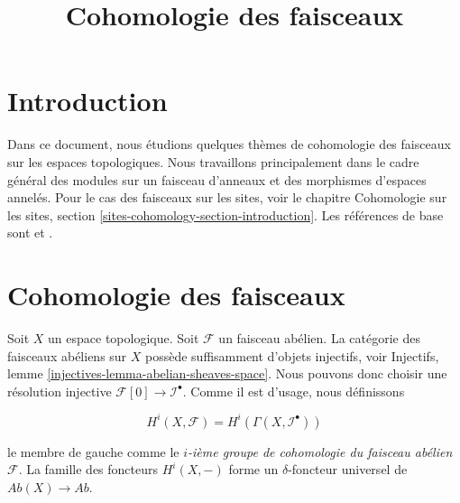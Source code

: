 

%


\title{Cohomologie des faisceaux}


\maketitle

\label{section-phantom}

\tableofcontents

\section{Introduction}

\label{section-introduction}

\noindent
Dans ce document, nous étudions quelques thèmes de cohomologie des faisceaux sur les espaces topologiques. Nous travaillons principalement dans le cadre général des modules sur un faisceau d'anneaux et des morphismes d'espaces annelés. Pour le cas des faisceaux sur les sites, voir le chapitre Cohomologie sur les sites, section \ref{sites-cohomology-section-introduction}. Les références de base sont \cite{Godement} et \cite{Iversen}.





\section{Cohomologie des faisceaux}

\label{section-cohomology-sheaves}

\noindent

Soit $X$ un espace topologique. Soit $\mathcal{F}$ un faisceau abélien. La catégorie des faisceaux abéliens sur $X$ possède suffisamment d'objets injectifs, voir Injectifs, lemme \ref{injectives-lemma-abelian-sheaves-space}. Nous pouvons donc choisir une résolution injective
$\mathcal{F}[0] \to \mathcal{I}^\bullet$. Comme il est d'usage, nous définissons

\begin{equation}
\label{equation-cohomology}
H^i(X, \mathcal{F}) = H^i(\Gamma(X, \mathcal{I}^\bullet))
\end{equation}

le membre de gauche comme le {\it $i$-ième groupe de cohomologie du faisceau abélien $\mathcal{F}$}. La famille des foncteurs $H^i(X, -)$ forme un $\delta$-foncteur universel de $\textit{Ab}(X) \to \textit{Ab}$.

